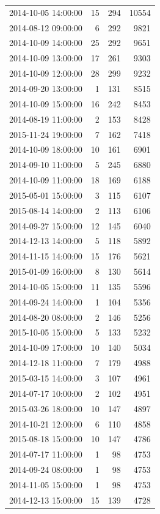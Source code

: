 \begin{tabular}{lrrr}
2014-10-05 14:00:00 & 15 & 294 & 10554 \\
2014-08-12 09:00:00 & 6 & 292 & 9821 \\
2014-10-09 14:00:00 & 25 & 292 & 9651 \\
2014-10-09 13:00:00 & 17 & 261 & 9303 \\
2014-10-09 12:00:00 & 28 & 299 & 9232 \\
2014-09-20 13:00:00 & 1 & 131 & 8515 \\
2014-10-09 15:00:00 & 16 & 242 & 8453 \\
2014-08-19 11:00:00 & 2 & 153 & 8428 \\
2015-11-24 19:00:00 & 7 & 162 & 7418 \\
2014-10-09 18:00:00 & 10 & 161 & 6901 \\
2014-09-10 11:00:00 & 5 & 245 & 6880 \\
2014-10-09 11:00:00 & 18 & 169 & 6188 \\
2015-05-01 15:00:00 & 3 & 115 & 6107 \\
2015-08-14 14:00:00 & 2 & 113 & 6106 \\
2014-09-27 15:00:00 & 12 & 145 & 6040 \\
2014-12-13 14:00:00 & 5 & 118 & 5892 \\
2014-11-15 14:00:00 & 15 & 176 & 5621 \\
2015-01-09 16:00:00 & 8 & 130 & 5614 \\
2014-10-05 15:00:00 & 11 & 135 & 5596 \\
2014-09-24 14:00:00 & 1 & 104 & 5356 \\
2014-08-20 08:00:00 & 2 & 146 & 5256 \\
2015-10-05 15:00:00 & 5 & 133 & 5232 \\
2014-10-09 17:00:00 & 10 & 140 & 5034 \\
2014-12-18 11:00:00 & 7 & 179 & 4988 \\
2015-03-15 14:00:00 & 3 & 107 & 4961 \\
2014-07-17 10:00:00 & 2 & 102 & 4951 \\
2015-03-26 18:00:00 & 10 & 147 & 4897 \\
2014-10-21 12:00:00 & 6 & 110 & 4858 \\
2015-08-18 15:00:00 & 10 & 147 & 4786 \\
2014-07-17 11:00:00 & 1 & 98 & 4753 \\
2014-09-24 08:00:00 & 1 & 98 & 4753 \\
2014-11-05 15:00:00 & 1 & 98 & 4753 \\
2014-12-13 15:00:00 & 15 & 139 & 4728 \\

\end{tabular}
